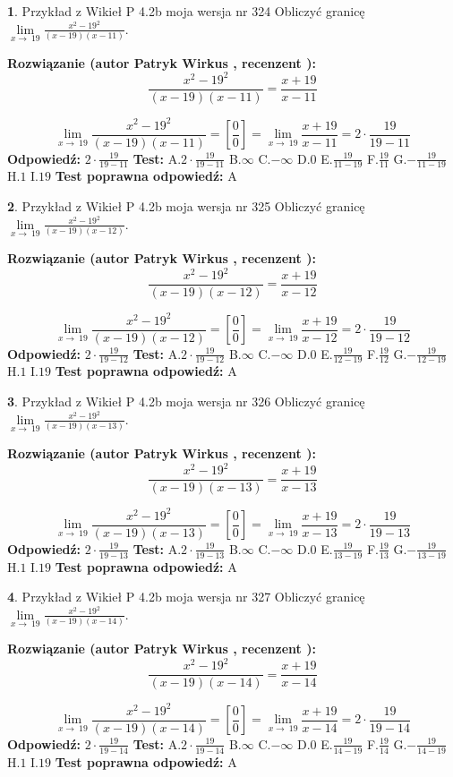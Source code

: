\documentclass[12pt, a4paper]{article}
\theoremstyle{definition} %
\newtheorem{zad}{}
\newcommand{\zadStart}[1]{\begin{zad}#1\newline}
\newcommand{\zadStop}{\end{zad}}
\newcommand{\rozwStart}[2]{\noindent \textbf{Rozwiązanie (autor #1 , recenzent #2): }\newline}
\newcommand{\rozwStop}{\newline}
\newcommand{\odpStart}{\noindent \textbf{Odpowiedź:}\newline}
\newcommand{\odpStop}{\newline}
\newcommand{\testStart}{\noindent \textbf{Test:}\newline}
\newcommand{\testStop}{\newline}
\newcommand{\kluczStart}{\noindent \textbf{Test poprawna odpowiedź:}\newline}
\newcommand{\kluczStop}{\newline}
\begin{document}
\zadStart{Przykład z Wikieł P 4.2b moja wersja nr 324}
Obliczyć granicę $\lim\limits_{x\to\ 19}\frac{x^{2}-19^{2}}{(x-19)(x-11)}$.
\zadStop
\rozwStart{Patryk Wirkus}{}
$$\frac{x^{2}-19^{2}}{(x-19)(x-11)}=\frac{x+19}{x-11}$$

$$\lim\limits_{x\to\ 19}\frac{x^{2}-19^{2}}{(x-19)(x-11)}=[\frac{0}{0}]=\lim\limits_{x\to\ 19}\frac{x+19}{x-11}=2 \cdot \frac{19}{19-11}$$
\rozwStop
\odpStart
$2 \cdot \frac{19}{19-11}$
\odpStop
\testStart
A.$2 \cdot \frac{19}{19-11}$
B.$\infty$
C.$-\infty$
D.$0$
E.$\frac{19}{11-19}$
F.$\frac{19}{11}$
G.$-\frac{19}{11-19}$
H.$1$
I.$19$
\testStop
\kluczStart
A
\kluczStop



\zadStart{Przykład z Wikieł P 4.2b moja wersja nr 325}
Obliczyć granicę $\lim\limits_{x\to\ 19}\frac{x^{2}-19^{2}}{(x-19)(x-12)}$.
\zadStop
\rozwStart{Patryk Wirkus}{}
$$\frac{x^{2}-19^{2}}{(x-19)(x-12)}=\frac{x+19}{x-12}$$

$$\lim\limits_{x\to\ 19}\frac{x^{2}-19^{2}}{(x-19)(x-12)}=[\frac{0}{0}]=\lim\limits_{x\to\ 19}\frac{x+19}{x-12}=2 \cdot \frac{19}{19-12}$$
\rozwStop
\odpStart
$2 \cdot \frac{19}{19-12}$
\odpStop
\testStart
A.$2 \cdot \frac{19}{19-12}$
B.$\infty$
C.$-\infty$
D.$0$
E.$\frac{19}{12-19}$
F.$\frac{19}{12}$
G.$-\frac{19}{12-19}$
H.$1$
I.$19$
\testStop
\kluczStart
A
\kluczStop



\zadStart{Przykład z Wikieł P 4.2b moja wersja nr 326}
Obliczyć granicę $\lim\limits_{x\to\ 19}\frac{x^{2}-19^{2}}{(x-19)(x-13)}$.
\zadStop
\rozwStart{Patryk Wirkus}{}
$$\frac{x^{2}-19^{2}}{(x-19)(x-13)}=\frac{x+19}{x-13}$$

$$\lim\limits_{x\to\ 19}\frac{x^{2}-19^{2}}{(x-19)(x-13)}=[\frac{0}{0}]=\lim\limits_{x\to\ 19}\frac{x+19}{x-13}=2 \cdot \frac{19}{19-13}$$
\rozwStop
\odpStart
$2 \cdot \frac{19}{19-13}$
\odpStop
\testStart
A.$2 \cdot \frac{19}{19-13}$
B.$\infty$
C.$-\infty$
D.$0$
E.$\frac{19}{13-19}$
F.$\frac{19}{13}$
G.$-\frac{19}{13-19}$
H.$1$
I.$19$
\testStop
\kluczStart
A
\kluczStop



\zadStart{Przykład z Wikieł P 4.2b moja wersja nr 327}
Obliczyć granicę $\lim\limits_{x\to\ 19}\frac{x^{2}-19^{2}}{(x-19)(x-14)}$.
\zadStop
\rozwStart{Patryk Wirkus}{}
$$\frac{x^{2}-19^{2}}{(x-19)(x-14)}=\frac{x+19}{x-14}$$

$$\lim\limits_{x\to\ 19}\frac{x^{2}-19^{2}}{(x-19)(x-14)}=[\frac{0}{0}]=\lim\limits_{x\to\ 19}\frac{x+19}{x-14}=2 \cdot \frac{19}{19-14}$$
\rozwStop
\odpStart
$2 \cdot \frac{19}{19-14}$
\odpStop
\testStart
A.$2 \cdot \frac{19}{19-14}$
B.$\infty$
C.$-\infty$
D.$0$
E.$\frac{19}{14-19}$
F.$\frac{19}{14}$
G.$-\frac{19}{14-19}$
H.$1$
I.$19$
\testStop
\kluczStart
A
\kluczStop
\end{document}
